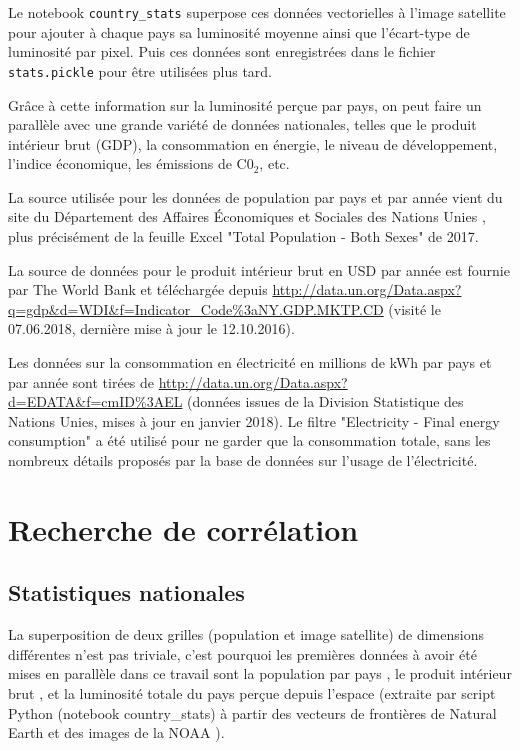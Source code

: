 \documentclass[a4paper, 11pt]{report}
\begin{document}
Le notebook \texttt{country\_stats} superpose ces données vectorielles à l'image satellite pour ajouter à chaque pays sa luminosité moyenne ainsi que l'écart-type de luminosité par pixel. Puis ces données sont enregistrées dans le fichier \texttt{stats.pickle} pour être utilisées plus tard.

Grâce à cette information sur la luminosité perçue par pays, on peut faire un parallèle avec une grande variété de données nationales, telles que le produit intérieur brut (GDP), la consommation en énergie, le niveau de développement, l'indice économique, les émissions de C0$_2$, etc.

La source utilisée pour les données de population par pays et par année vient du site du Département des Affaires Économiques et Sociales des Nations Unies \cite{un-wpp}, plus précisément de la feuille Excel "Total Population - Both Sexes" de 2017.

La source de données pour le produit intérieur brut en USD par année est fournie par The World Bank \cite{theworldbank} et téléchargée depuis \url{http://data.un.org/Data.aspx?q=gdp&d=WDI&f=Indicator_Code%3aNY.GDP.MKTP.CD} (visité le 07.06.2018, dernière mise à jour le 12.10.2016).

Les données sur la consommation en électricité en millions de kWh par pays et par année sont tirées de \url{http://data.un.org/Data.aspx?d=EDATA&f=cmID%3AEL} (données issues de la Division Statistique des Nations Unies, mises à jour en janvier 2018). Le filtre "Electricity - Final energy consumption" a été utilisé pour ne garder que la consommation totale, sans les nombreux détails proposés par la base de données sur l'usage de l'électricité.

\section{Recherche de corrélation}
\subsection{Statistiques nationales}
La superposition de deux grilles (population et image satellite) de dimensions différentes n'est pas triviale, c'est pourquoi les premières données à avoir été mises en parallèle dans ce travail sont la population par pays \cite{un-wpp}, le produit intérieur brut \cite{theworldbank}, et la luminosité totale du pays perçue depuis l'espace (extraite par script Python (notebook country\_stats) à partir des vecteurs de frontières de Natural Earth \cite{naturalearthdata} et des images de la NOAA \cite{noaa}).
\end{document}
